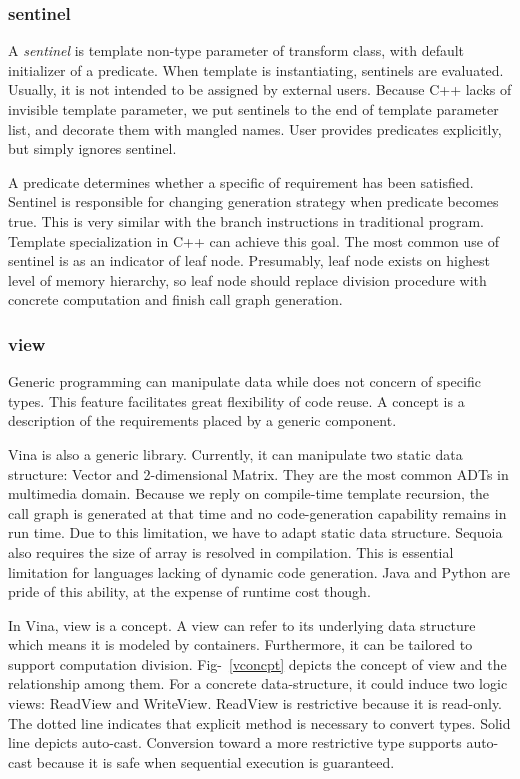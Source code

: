 \documentclass[a4paper, 11pt]{article}
\begin{document}
\subsubsection{sentinel}
A \emph{sentinel} is template non-type parameter of transform class, with default initializer of a predicate. When template is instantiating, sentinels are evaluated. Usually, it is not intended to be assigned by external users. Because C++ lacks of invisible template parameter, we put sentinels to the end of template parameter list, and decorate them with mangled names. User provides predicates explicitly, but simply ignores sentinel. 

A predicate determines whether a specific of requirement has been satisfied. Sentinel is responsible for changing generation strategy when predicate becomes true. This is very similar with the branch instructions in traditional program. Template specialization in C++ can achieve this goal. The most common use of sentinel is as an indicator of leaf node. Presumably, leaf node exists on highest level of memory hierarchy, so leaf node should replace division procedure with concrete computation and finish call graph generation.
\subsubsection{view}
Generic programming can manipulate data while does not concern of specific types. This feature facilitates great flexibility of code reuse. A concept is a description of the requirements placed by a generic component.

Vina is also a generic library. Currently, it can manipulate two static data structure: Vector and 2-dimensional Matrix. They are the most common ADTs in multimedia domain. Because we reply on compile-time template recursion, the call graph is generated at that time and no code-generation capability remains in run time. Due to this limitation, we have to adapt static data structure. Sequoia also requires the size of array is resolved in compilation. This is essential limitation for languages lacking of dynamic code generation. Java and Python are pride of this ability, at the expense of runtime cost though.

In Vina, view is a concept. A view can refer to its underlying data structure which means it is modeled by containers. Furthermore, it can be tailored to support computation division. Fig-~\ref{vconcpt} depicts the concept of view and the relationship among them. For a concrete data-structure, it could induce two logic views: ReadView and WriteView. ReadView is restrictive because it is read-only. The dotted line indicates that explicit method is necessary to convert types. Solid line depicts auto-cast. Conversion toward a more restrictive type supports auto-cast because it is safe when sequential execution is guaranteed. 
\end{document}
